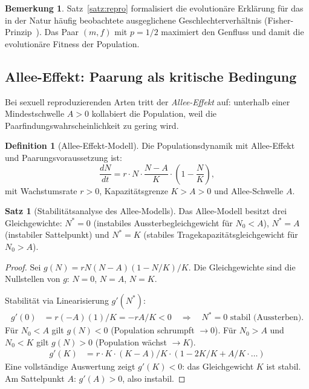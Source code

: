 ﻿\documentclass[a4paper,12pt]{article}
\theoremstyle{definition}
\newtheorem{definition}{Definition}
\newtheorem{satz}{Satz}
\newtheorem{bemerkung}{Bemerkung}
\begin{document}
\begin{bemerkung}
	Satz~\ref{satz:repro} formalisiert die evolutionäre Erklärung für das in der
	Natur häufig beobachtete ausgeglichene Geschlechterverhältnis (Fisher-Prinzip~\cite{mayr1963}).
	Das Paar $(m, f)$ mit $p = 1/2$ maximiert den Genfluss und damit die
	evolutionäre Fitness der Population.
\end{bemerkung}

\subsection{Allee-Effekt: Paarung als kritische Bedingung}

Bei sexuell reproduzierenden Arten tritt der \emph{Allee-Effekt} auf: unterhalb einer
Mindestschwelle $A > 0$ kollabiert die Population, weil die Paarfindungswahrscheinlichkeit
zu gering wird.

\begin{definition}[Allee-Effekt-Modell]
	Die Populationsdynamik mit Allee-Effekt und Paarungsvoraussetzung ist:
	\[
		\frac{dN}{dt} = r \cdot N \cdot \frac{N - A}{K} \cdot \left(1 - \frac{N}{K}\right),
	\]
	mit Wachstumsrate $r > 0$, Kapazitätsgrenze $K > A > 0$ und Allee-Schwelle $A$.
\end{definition}

\begin{satz}[Stabilitätsanalyse des Allee-Modells]
	Das Allee-Modell besitzt drei Gleichgewichte:
	$N^* = 0$ (instabiles Aussterbegleichgewicht für $N_0 < A$),
	$N^* = A$ (instabiler Sattelpunkt) und
	$N^* = K$ (stabiles Tragekapazitätsgleichgewicht für $N_0 > A$).
\end{satz}

\begin{proof}
	Sei $g(N) = r N (N-A)(1 - N/K)/K$. Die Gleichgewichte sind die Nullstellen von $g$:
	$N = 0$, $N = A$, $N = K$.
	
	Stabilität via Linearisierung $g'(N^*)$:
	\begin{align*}
		g'(0) &= r(-A)(1) / K = -rA/K < 0 \quad\Rightarrow\quad N^*=0 \text{ stabil (Aussterben).}
	\end{align*}
	Für $N_0 < A$ gilt $g(N) < 0$ (Population schrumpft $\to 0$).
	Für $N_0 > A$ und $N_0 < K$ gilt $g(N) > 0$ (Population wächst $\to K$).
	\begin{align*}
		g'(K) &= r \cdot K \cdot (K-A)/K \cdot (1 - 2K/K + A/K \cdot \ldots)
	\end{align*}
	Eine vollständige Auswertung zeigt $g'(K) < 0$: das Gleichgewicht $K$ ist stabil.
	Am Sattelpunkt $A$: $g'(A) > 0$, also instabil. \qedhere
\end{proof}
\end{document}
